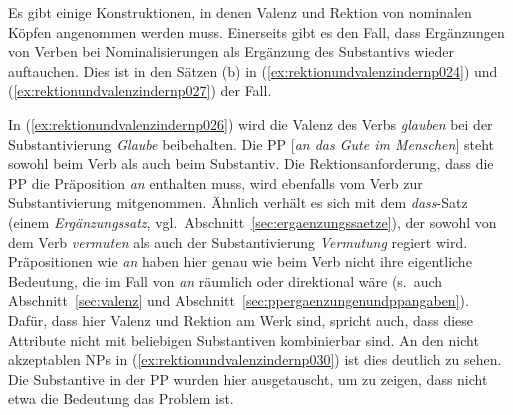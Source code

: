 
Es gibt einige Konstruktionen, in denen Valenz und Rektion von nominalen Köpfen angenommen werden muss.
Einerseits gibt es den Fall, dass Ergänzungen von Verben bei Nominalisierungen als Ergänzung des Substantivs wieder auftauchen.
Dies ist in den Sätzen (b) in (\ref{ex:rektionundvalenzindernp024}) und (\ref{ex:rektionundvalenzindernp027}) der Fall.

\begin{exe}
  \ex\label{ex:rektionundvalenzindernp024}
  \begin{xlist}
  \end{xlist}
  \ex\label{ex:rektionundvalenzindernp027}
  \begin{xlist}
  \end{xlist}
\end{exe}

In (\ref{ex:rektionundvalenzindernp026}) wird die Valenz des Verbs \textit{glauben} bei der Substantivierung \textit{Glaube} beibehalten.
Die PP [\textit{an das Gute im Menschen}] steht sowohl beim Verb als auch beim Substantiv.
Die Rektionsanforderung, dass die PP die Präposition \textit{an} enthalten muss, wird ebenfalls vom Verb zur Substantivierung mitgenommen.
Ähnlich verhält es sich mit dem \textit{dass}-Satz (einem \textit{Ergänzungssatz}, vgl.\ Abschnitt~\ref{sec:ergaenzungssaetze}), der sowohl von dem Verb \textit{vermuten} als auch der Substantivierung \textit{Vermutung} regiert wird.
Präpositionen wie \textit{an} haben hier genau wie beim Verb nicht ihre eigentliche Bedeutung, die im Fall von \textit{an} räumlich oder direktional wäre (s.\ auch Abschnitt~\ref{sec:valenz} und Abschnitt~\ref{sec:ppergaenzungenundppangaben}).
Dafür, dass hier Valenz und Rektion am Werk sind, spricht auch, dass diese Attribute nicht mit beliebigen Substantiven kombinierbar sind.
An den nicht akzeptablen NPs in (\ref{ex:rektionundvalenzindernp030}) ist dies deutlich zu sehen.
Die Substantive in der PP wurden hier ausgetauscht, um zu zeigen, dass nicht etwa die Bedeutung das Problem ist.

